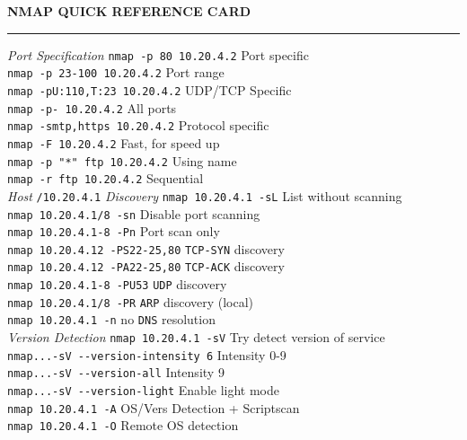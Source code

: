 \documentclass[a4paper,10pt]{article}
\begin{document}
\begin{multicols}{3} %

\begin{center}
    \textbf{NMAP QUICK REFERENCE CARD}
    \vskip-5pt
    \par\noindent\hrule
\end{center}

\textit{Port Specification}
\vskip-5pt
\verb|nmap -p 80 10.20.4.2| \dotfill Port specific\\
\verb|nmap -p 23-100 10.20.4.2| \dotfill Port range\\
\verb|nmap -pU:110,T:23 10.20.4.2| \dotfill UDP/TCP Specific\\
\verb|nmap -p- 10.20.4.2| \dotfill All ports\\
\verb|nmap -smtp,https 10.20.4.2| \dotfill Protocol specific\\
\verb|nmap -F 10.20.4.2| \dotfill Fast, for speed up\\
\verb|nmap -p "*" ftp 10.20.4.2| \dotfill Using name\\
\verb|nmap -r ftp 10.20.4.2| \dotfill Sequential\\

\textit{Host} \verb|/10.20.4.1| \textit{Discovery}
\vskip-5pt
\verb|nmap 10.20.4.1 -sL| \dotfill List without scanning\\
\verb|nmap 10.20.4.1/8 -sn| \dotfill Disable port scanning\\
\verb|nmap 10.20.4.1-8 -Pn| \dotfill Port scan only\\
\verb|nmap 10.20.4.12 -PS22-25,80| \dotfill \verb|TCP-SYN| discovery\\
\verb|nmap 10.20.4.12 -PA22-25,80| \dotfill \verb|TCP-ACK| discovery\\
\verb|nmap 10.20.4.1-8 -PU53| \dotfill \verb|UDP| discovery\\
\verb|nmap 10.20.4.1/8 -PR| \dotfill \verb|ARP| discovery (local)\\
\verb|nmap 10.20.4.1 -n| \dotfill no \verb|DNS| resolution\\

\textit{Version Detection}
\vskip-5pt
\verb|nmap 10.20.4.1 -sV| \dotfill Try detect version of service\\
\verb|nmap...-sV --version-intensity 6| \dotfill Intensity 0-9\\
\verb|nmap...-sV --version-all| \dotfill Intensity 9\\
\verb|nmap...-sV --version-light| \dotfill Enable light mode\\
\verb|nmap 10.20.4.1 -A| \dotfill OS/Vers Detection + Scriptscan\\
\verb|nmap 10.20.4.1 -O| \dotfill Remote OS detection\\


\end{multicols}
\end{document}
